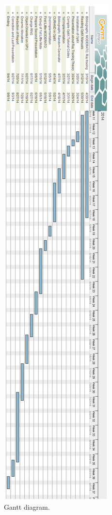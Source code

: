 \begin{figure}[htbp]
	\centering
		\includegraphics[width=\textwidth,height=\textheight,keepaspectratio]{Figures/report.png}
	\caption{Gantt diagram.}
\end{figure}